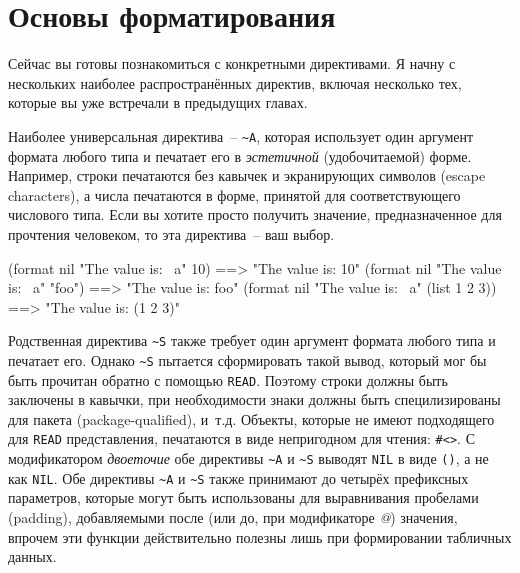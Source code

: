 \vfill{}

\section{Основы форматирования}

Сейчас вы готовы познакомиться с конкретными директивами. Я начну с нескольких наиболее
распространённых директив, включая несколько тех, которые вы уже встречали в предыдущих
главах.

Наиболее универсальная директива~-- \lstinline!~A!, которая использует один аргумент
формата любого типа и печатает его в \textit{эстетичной} (удобочитаемой) форме. Например,
строки печатаются без кавычек и экранирующих символов (escape characters), а числа
печатаются в форме, принятой для соответствующего числового типа. Если вы хотите просто
получить значение, предназначенное для прочтения человеком, то эта директива~-- ваш выбор.

\begin{myverb}
(format nil "The value is: ~a" 10)           ==> "The value is: 10"
(format nil "The value is: ~a" "foo")        ==> "The value is: foo"
(format nil "The value is: ~a" (list 1 2 3)) ==> "The value is: (1 2 3)"
\end{myverb}

Родственная директива \lstinline!~S! также требует один аргумент формата любого типа и
печатает его. Однако \lstinline!~S!  пытается сформировать такой вывод, который мог бы
быть прочитан обратно с помощью \lstinline{READ}. Поэтому строки должны быть заключены в
кавычки, при необходимости знаки должны быть специлизированы для пакета
(package-qualified), и~т.д.  Объекты, которые не имеют подходящего для \lstinline{READ}
представления, печатаются в виде непригодном для чтения: \lstinline!#<>!.  С модификатором
\textit{двоеточие} обе директивы \lstinline!~A! и \lstinline!~S!  выводят
\lstinline{NIL} в виде \lstinline{()}, а не как \lstinline{NIL}. Обе директивы
\lstinline!~A! и \lstinline!~S! также принимают до четырёх префиксных параметров, которые
могут быть использованы для выравнивания пробелами (padding), добавляемыми после
(или до, при модификаторе \textit{@}) значения, впрочем эти функции действительно полезны
лишь при формировании табличных данных.

